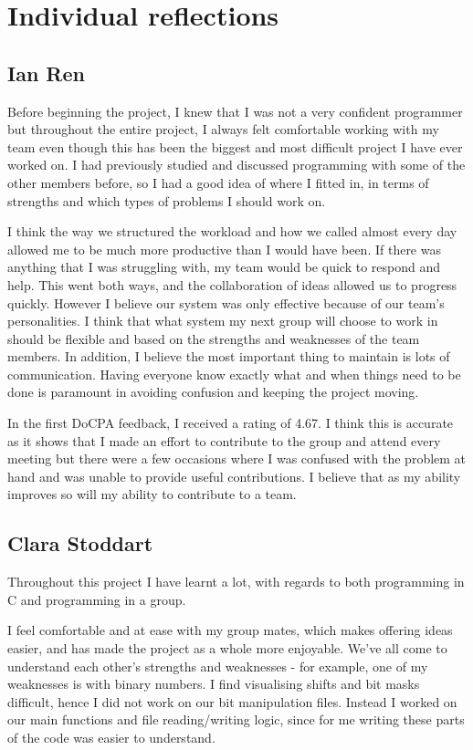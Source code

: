 \documentclass[11pt]{article}
\begin{document}
\section*{Individual reflections}

\subsection*{Ian Ren}
Before beginning the project, I knew that I was not a very confident programmer but throughout the entire project, I always felt comfortable working with my team even though this has been the biggest and most difficult project I have ever worked on. I had previously studied and discussed programming with some of the other members before, so I had a good idea of where I fitted in, in terms of strengths and which types of problems I should work on.

I think the way we structured the workload and how we called almost every day allowed me to be much more productive than I would have been. If there was anything that I was struggling with, my team would be quick to respond and help. This went both ways, and the collaboration of ideas allowed us to progress quickly. However I believe our system was only effective because of our team’s personalities. I think that what system my next group will choose to work in should be flexible and based on the strengths and weaknesses of the team members. In addition, I believe the most important thing to maintain is lots of communication. Having everyone know exactly what and when things need to be done is paramount in avoiding confusion and keeping the project moving.

In the first DoCPA feedback, I received a rating of 4.67. I think this is accurate as it shows that I made an effort to contribute to the group and attend every meeting but there were a few occasions where I was confused with the problem at hand and was unable to provide useful contributions. I believe that as my ability improves so will my ability to contribute to a team.

\subsection*{Clara Stoddart}
Throughout this project I have learnt a lot, with regards to both programming in C and programming in a group. 

I feel comfortable and at ease with my group mates, which makes offering ideas easier, and has made the project as a whole more enjoyable. We've all come to understand each other's strengths and weaknesses - for example, one of my weaknesses is with binary numbers. I find visualising shifts and bit masks difficult, hence I did not work on our bit manipulation files. Instead I worked on our main functions and file reading/writing logic, since for me writing these parts of the code was easier to understand. 
\end{document}
